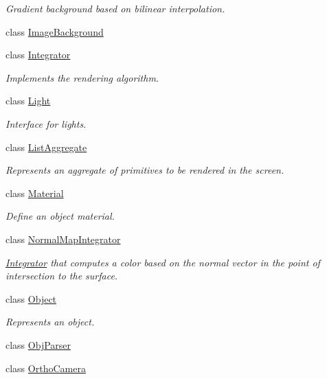 \begin{DoxyCompactItemize}
\begin{DoxyCompactList}\small\item\em Gradient background based on bilinear interpolation. \end{DoxyCompactList}\item 
class \mbox{\hyperlink{classomg_1_1_image_background}{Image\+Background}}
\item 
class \mbox{\hyperlink{classomg_1_1_integrator}{Integrator}}
\begin{DoxyCompactList}\small\item\em Implements the rendering algorithm. \end{DoxyCompactList}\item 
class \mbox{\hyperlink{classomg_1_1_light}{Light}}
\begin{DoxyCompactList}\small\item\em Interface for lights. \end{DoxyCompactList}\item 
class \mbox{\hyperlink{classomg_1_1_list_aggregate}{List\+Aggregate}}
\begin{DoxyCompactList}\small\item\em Represents an aggregate of primitives to be rendered in the screen. \end{DoxyCompactList}\item 
class \mbox{\hyperlink{classomg_1_1_material}{Material}}
\begin{DoxyCompactList}\small\item\em Define an object material. \end{DoxyCompactList}\item 
class \mbox{\hyperlink{classomg_1_1_normal_map_integrator}{Normal\+Map\+Integrator}}
\begin{DoxyCompactList}\small\item\em \mbox{\hyperlink{classomg_1_1_integrator}{Integrator}} that computes a color based on the normal vector in the point of intersection to the surface. \end{DoxyCompactList}\item 
class \mbox{\hyperlink{classomg_1_1_object}{Object}}
\begin{DoxyCompactList}\small\item\em Represents an object. \end{DoxyCompactList}\item 
class \mbox{\hyperlink{classomg_1_1_obj_parser}{Obj\+Parser}}
\item 
class \mbox{\hyperlink{classomg_1_1_ortho_camera}{Ortho\+Camera}}

\end{DoxyCompactItemize}
